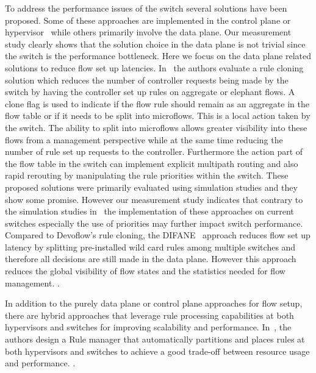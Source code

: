 To address the performance issues of the switch several solutions have been proposed. Some of these approaches are implemented in the control plane or hypervisor~\cite{Cassado, Seawall} while others primarily involve the data plane. Our measurement study clearly shows that the solution choice in the data plane is not trivial since 
the switch is the performance bottleneck. Here we focus on the data plane related solutions to reduce flow set up latencies. 
In~\cite{devoflow} the authors evaluate a rule cloning solution which reduces the number of controller requests being made by the switch by 
having the controller set up rules on aggregate or elephant flows. A clone flag is used to indicate if the flow rule should remain as an aggregate in the flow table or 
if it needs to be split into microflows. This is a local action taken by the switch. The ability to split into microflows allows greater visibility into 
these flows from a management perspective while at the same time reducing the number of rule set up requests to the controller. 
Furthermore the action part of the flow table in the switch can implement explicit multipath routing and also rapid rerouting by manipulating the 
rule priorities within the switch. These proposed solutions were primarily evaluated using simulation studies and they show some promise. 
However our measurement study indicates that contrary to the simulation studies in~\cite{devoflow} the implementation of these approaches on 
current switches especially the use of priorities may further impact switch performance. Compared to Devoflow's rule cloning, 
the DIFANE~\cite{difane} approach reduces flow set up latency by splitting pre-installed wild card rules among multiple switches and 
therefore all decisions are still made in the data plane. 
However this approach reduces the global visibility of flow states and the statistics needed for flow management. 
.

In addition to the purely data plane or control plane approaches for flow setup, there are hybrid approaches that leverage rule processing capabilities at 
both hypervisors and switches for improving scalability and performance. 
In~\cite{minlanvcrib}, the authors design a Rule manager that automatically partitions and places rules at both hypervisors and switches to 
achieve a good trade-off between resource usage and performance. 
. 
